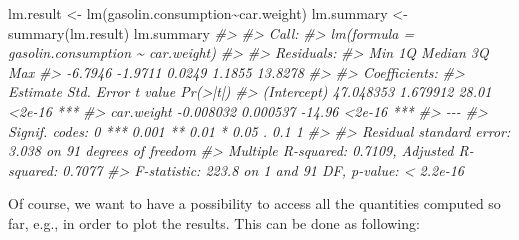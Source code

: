\documentclass[
  14pt,
]{memoir}
\newenvironment{Shaded}{\begin{snugshade}}{\end{snugshade}}
\newcommand{\CommentTok}[1]{\textcolor[rgb]{0.56,0.35,0.01}{\textit{#1}}}
\newcommand{\FunctionTok}[1]{\textcolor[rgb]{0.00,0.00,0.00}{#1}}
\newcommand{\NormalTok}[1]{#1}
\newcommand{\OtherTok}[1]{\textcolor[rgb]{0.56,0.35,0.01}{#1}}
\newcommand{\SpecialCharTok}[1]{\textcolor[rgb]{0.00,0.00,0.00}{#1}}
\begin{document}
\begin{Shaded}
\begin{Highlighting}[]
\NormalTok{lm.result   }\OtherTok{\textless{}{-}} \FunctionTok{lm}\NormalTok{(gasolin.consumption}\SpecialCharTok{\textasciitilde{}}\NormalTok{car.weight)}
\NormalTok{lm.summary  }\OtherTok{\textless{}{-}} \FunctionTok{summary}\NormalTok{(lm.result)}
\NormalTok{lm.summary}
\CommentTok{\#\textgreater{} }
\CommentTok{\#\textgreater{} Call:}
\CommentTok{\#\textgreater{} lm(formula = gasolin.consumption \textasciitilde{} car.weight)}
\CommentTok{\#\textgreater{} }
\CommentTok{\#\textgreater{} Residuals:}
\CommentTok{\#\textgreater{}     Min      1Q  Median      3Q     Max }
\CommentTok{\#\textgreater{} {-}6.7946 {-}1.9711  0.0249  1.1855 13.8278 }
\CommentTok{\#\textgreater{} }
\CommentTok{\#\textgreater{} Coefficients:}
\CommentTok{\#\textgreater{}              Estimate Std. Error t value Pr(\textgreater{}|t|)    }
\CommentTok{\#\textgreater{} (Intercept) 47.048353   1.679912   28.01   \textless{}2e{-}16 ***}
\CommentTok{\#\textgreater{} car.weight  {-}0.008032   0.000537  {-}14.96   \textless{}2e{-}16 ***}
\CommentTok{\#\textgreater{} {-}{-}{-}}
\CommentTok{\#\textgreater{} Signif. codes:  0 \textquotesingle{}***\textquotesingle{} 0.001 \textquotesingle{}**\textquotesingle{} 0.01 \textquotesingle{}*\textquotesingle{} 0.05 \textquotesingle{}.\textquotesingle{} 0.1 \textquotesingle{} \textquotesingle{} 1}
\CommentTok{\#\textgreater{} }
\CommentTok{\#\textgreater{} Residual standard error: 3.038 on 91 degrees of freedom}
\CommentTok{\#\textgreater{} Multiple R{-}squared:  0.7109, Adjusted R{-}squared:  0.7077 }
\CommentTok{\#\textgreater{} F{-}statistic: 223.8 on 1 and 91 DF,  p{-}value: \textless{} 2.2e{-}16}
\end{Highlighting}
\end{Shaded}

\hfill\break

Of course, we want to have a possibility to access all the quantities computed so far, e.g., in order to plot the results. This can be done as following:
\end{document}
